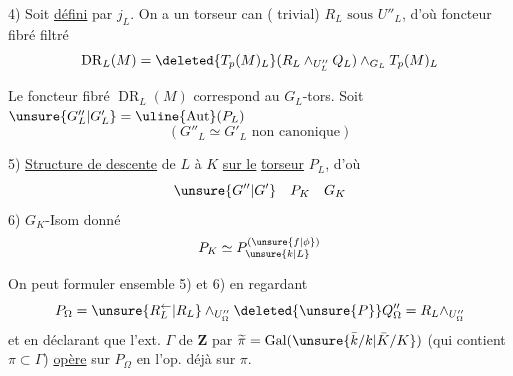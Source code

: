 4) Soit
\uline{défini} par $j_L$. On a un torseur
 can ( trivial)
$\boxed{R_L\text{ sous }U''_L}$, d'où foncteur fibré filtré
\[
\operatorname{DR}_L(M)=\deleted{T_p(M)_L}
(R_L\wedge_{U''_L}Q_L)\wedge_{G_L}T_p(M)_L
\]

 Le foncteur fibré $\operatorname{DR}_L(M)$ correspond au $G_L$-tors.
Soit $\unsure{G''_L|G'_L}=\uline{\operatorname{Aut}}(P_L)$
\[
(G''_L\simeq G'_L\text{ non canonique})
\]

5) \uline{Structure de descente} de $L$ à $K$ \uline{sur le}
\uline{torseur} $P_L$, d'où
\[
\unsure{G''|G'}\quad P_K\quad G_K
\]
6) $G_K$-Isom donné
\[
P_K\simeq P_{\unsure{k|L}}^{(\unsure{f|\phi})}
\]

On peut formuler ensemble 5) et 6) en regardant
\[
P_\Omega=\unsure{R_L^{\leftarrow}|R_L}\wedge_{U''_\Omega}\deleted{\unsure{P}}Q''_\Omega
=R_L\wedge_{U''_\Omega}
\]
et en déclarant que l'ext. $\Gamma$ de $\mathbf Z$ par
$\widetilde\pi=\operatorname{Gal}(\unsure{\bar k/k|\bar K/K})$
(qui contient $\pi\subset\Gamma$) \uline{opère} sur $P_\Omega$ en 
l'op.  déjà sur $\pi$.
